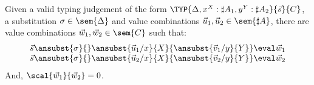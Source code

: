 \begin{lemma}\label{lem:OrthogonalSubstitution} %
Given a valid typing judgement of the form $\TYP{\Delta, x^{X}:\sharp A_1, y^{Y}: \sharp A_2}{\vec{s}}{C}$, a substitution $\sigma\in\sem{\Delta}$ and value combinations $\vec{u}_{1},\vec{u}_{2}\in\sem{\sharp A}$, there are value combinations $\vec{w}_{1},\vec{w}_{2}\in\sem{C}$ such that:
\[
\begin{array}{c}
    \vec{s}\ansubst{\sigma}{}\ansubst{\vec{u}_{1}/x}{X}{\ansubst{\vec{v}_{1}/y}{Y}}\eval\vec{w}_{1}\\
    \vec{s}\ansubst{\sigma}{}\ansubst{\vec{u}_{2}/x}{X}{\ansubst{\vec{v}_{2}/y}{Y}}\eval\vec{w}_{2}\\
\end{array}
\]
And, $\scal{\vec{w}_{1}}{\vec{w}_{2}} = 0$.
\end{lemma}

